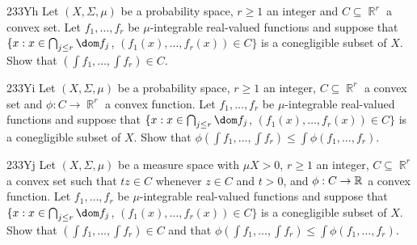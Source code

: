 {\spheader 233Yh Let $(X,\Sigma,\mu)$ be a probability space, $r\ge 1$ an
integer and $C\subseteq\BbbR^r$ a convex set.   
Let $f_1,\ldots,f_r$ be $\mu$-integrable real-valued functions
and suppose that $\{x:x\in\bigcap_{j\le r}\dom f_j$,
$(f_1(x),\ldots,f_r(x))\in C\}$ is a conegligible subset of $X$.
Show that $(\int f_1,\ldots,\int f_r)\in C$.

\spheader 233Yi Let $(X,\Sigma,\mu)$ be a probability space, $r\ge 1$ an
integer, $C\subseteq\BbbR^r$ a convex set and $\phi:C\to\BbbR^r$ a convex
function.   Let $f_1,\ldots,f_r$ be $\mu$-integrable real-valued functions
and suppose that $\{x:x\in\bigcap_{j\le r}\dom f_j$,
$(f_1(x),\ldots,f_r(x))\in C\}$ is a conegligible subset of $X$.
Show that $\phi(\int f_1,\ldots,\int f_r)\le\int\phi(f_1,\ldots,f_r)$.

\spheader 233Yj Let $(X,\Sigma,\mu)$ be a measure space with $\mu X>0$, 
$r\ge 1$ an
integer, $C\subseteq\BbbR^r$ a convex set such that $tz\in C$ whenever
$z\in C$ and $t>0$, and $\phi:C\to\Bbb R$ a convex function.
Let $f_1,\ldots,f_r$ be $\mu$-integrable real-valued functions
and suppose that $\{x:x\in\bigcap_{j\le r}\dom f_j$,
$(f_1(x),\ldots,f_r(x))\in C\}$ is a conegligible subset of $X$.
Show that $(\int f_1,\ldots,\int f_r)\in C$ and that
$\phi(\int f_1,\ldots,\int f_r)\le\int\phi(f_1,\ldots,f_r)$.

}%


